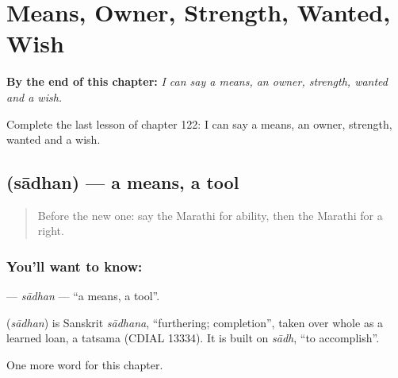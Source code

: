 
\chapter{Means, Owner, Strength, Wanted, Wish}
\label{ch:mr-means-owner-strength-wanted-wish}

\begin{chapteropening}
\textbf{By the end of this chapter:} \emph{I can say a means, an owner, strength, wanted and a wish.}

Complete the last lesson of chapter 122: I can say a means, an owner, strength, wanted and a wish.
\end{chapteropening}

\section[\texorpdfstring{\mr{साधन} (sādhan)}{साधन (sādhan)}]{ (sādhan) — a means, a tool}

\label{lesson:MR-C122-sadhan}



\begin{quote}
Before the new one: say the Marathi for ability, then the Marathi for a right.
\end{quote}

\subsection*{You'll want to know: }
\textbf{} — \emph{sādhan} — \textquotedblleft{}a means, a tool\textquotedblright{}.

\begin{cousinweb}
\textbf{} (\emph{sādhan}) is Sanskrit \emph{sādhana}, \textquotedblleft{}furthering; completion\textquotedblright{}, taken over whole as a learned loan, a tatsama (CDIAL 13334). It is built on \emph{sādh}, \textquotedblleft{}to accomplish\textquotedblright{}.
\end{cousinweb}

\begin{grammarlens}[title={What you've built}]
One more word for this chapter.
\end{grammarlens}

